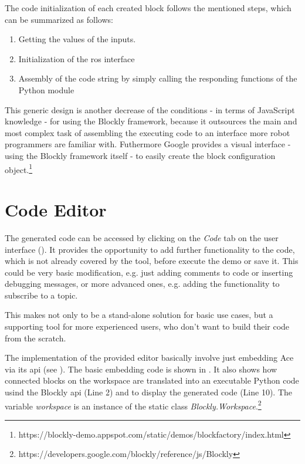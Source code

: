The code initialization of each created block follows the mentioned steps, which can be summarized as follows:
\begin{enumerate}
	\item Getting the values of the inputs.
	\item Initialization of the \gls{ros} interface
	\item Assembly of the code string by simply calling the responding functions of the Python module
\end{enumerate}

This generic design is another decrease of the conditions - in terms of JavaScript knowledge - for using the Blockly framework, because it outsources the main and most complex task of assembling the executing code to an interface more robot programmers are familiar with. Futhermore Google provides a visual interface - using the Blockly framework itself - to easily create the block configuration object.\footnote{https://blockly-demo.appspot.com/static/demos/blockfactory/index.html}

\section{Code Editor} \label{sec:CodeEditor}
The generated code can be accessed by clicking on the \textit{Code} tab on the user interface (). It provides the opportunity to add further functionality to the code, which is not already covered by the tool, before execute the demo or save it. This could be very basic modification, e.g. just adding comments to code or inserting debugging messages, or more advanced ones, e.g. adding the functionality to subscribe to a topic.

This makes \toolname{} not only to be a stand-alone solution for basic use cases, but a supporting tool for more experienced users, who don't want to build their code from the scratch.

\begin{figure}[htbp]
	
\end{figure}

The implementation of the provided editor basically involve just embedding Ace via its \gls{api} (see ). The basic embedding code is shown in . It also shows how connected blocks on the workspace are translated into an executable Python code usind the Blockly \gls{api} (Line 2) and to display the generated code (Line 10). The variable \textit{workspace} is an instance of the static class \textit{Blockly.Workspace}.\footnote{https://developers.google.com/blockly/reference/js/Blockly}

